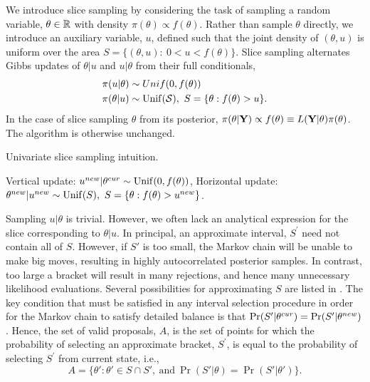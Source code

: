 We introduce slice sampling by considering the task of sampling a random variable, $ \theta\in\mathbb{R} $ with density $ \pi(\theta)\propto f(\theta) $.  Rather than sample $ \theta $ directly, we introduce an auxiliary variable, $ u $, defined such that the joint density of $ (\theta,u) $ is uniform over the area $ S = \lbrace (\theta,u):\ 0<u<f(\theta) \rbrace. $ Slice sampling alternates Gibbs updates of $ \theta|u $ and $ u|\theta $ from their full conditionals,
\begin{align*}
\pi(u|\theta) &\sim Unif(0,f(\theta)) \\
\pi(\theta|u) &\sim \mathrm{Unif}(\mathcal{S}),\ S = \lbrace \theta: f(\theta) > u\rbrace.
\end{align*}
In the case of slice sampling $ \theta $ from its posterior, $ \pi(\theta|\mathbf{Y})\propto f(\theta) \equiv L(\mathbf{Y}|\theta)\pi(\theta) $. The algorithm is otherwise unchanged. 

\begin{algorithm}[htbp]
	\caption{Univariate slice sampling intuition.}\label{alg:univar_slice_intuition}
	\begin{algorithmic}[1]
		\State Vertical update: $ u^{new}|\theta^{cur} \sim \mathrm{Unif}(0,f(\theta))$,
		\State Horizontal update: $ \theta^{new}|u^{new} \sim \mathrm{Unif}(S),\ S = \lbrace \theta: f(\theta) > u^{new}\rbrace$.
		\EndProcedure
	\end{algorithmic}
\end{algorithm}
Sampling $ u|\theta $ is trivial. However, we often lack an analytical expression for the slice corresponding to $ \theta|u $. In principal, an approximate interval, $ S^\prime $ need not contain all of $ S $. 
However, if $ S' $ is too small, the Markov chain will be unable to make big moves, resulting in highly autocorrelated posterior samples. In contrast, too large a bracket will result in many rejections, and hence many unnecessary likelihood evaluations. Several possibilities for approximating $ S $ are listed in \cite{neal2003slice}. The key condition that must be satisfied in any interval selection procedure in order for the Markov chain to satisfy detailed balance is that $ \Pr(S'|\theta^{cur}) = \Pr(S'|\theta^{new}) $. Hence, the set of valid proposals, $ A $, is the set of points for which the probability of selecting an approximate bracket, $ S^\prime $, is equal to the probability of selecting $ S^\prime $ from current state, i.e., \[ A = \lbrace \theta': \theta' \in S\cap S',\ \mathrm{and}\ \Pr(S'|\theta) = \Pr(S'|\theta')\rbrace. \]

